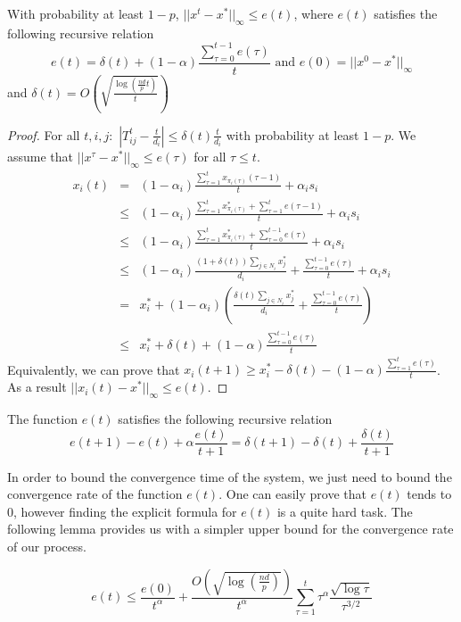 \begin{lemma}
With probability at least $1-p$, $||x^t - x^*||_{\infty} \leq e(t)$, where $e(t)$ satisfies the following recursive relation
$$e(t) = \delta(t) + (1-\alpha)\frac{\sum_{\tau=0}^{t-1}e(\tau)}{t} \text{ and } e(0)=||x^0 - x^*||_{\infty}$$
and $\delta(t)=O(\sqrt{\frac{\log(\frac{nd}{p}t)}{t}})$
\end{lemma}
\begin{proof}
For all $t,i,j:$ $|T_{ij}^t - \frac{t}{d_i}|\leq \delta(t)\frac{t}{d_i}$ with probability at least $1-p$. We assume that $||x^{\tau}-x^*||_{\infty} \leq e(\tau)$ for all $\tau \leq t$.
\begin{eqnarray*}
x_i(t) &=& (1-\alpha_i)\frac{\sum_{\tau=1}^{t}x_{\pi_i(\tau)}(\tau-1)}{t} + \alpha_i s_i\\
&\leq& (1-\alpha_i)\frac{\sum_{\tau=1}^{t}x^*_{\pi_i(\tau)} + \sum_{\tau=1}^{t} e(\tau-1)}{t} + \alpha_i s_i\\
&\leq& (1-\alpha_i)\frac{\sum_{\tau=1}^{t}x^*_{\pi_i(\tau)} + \sum_{\tau=0}^{t-1} e(\tau)}{t} + \alpha_i s_i\\
&\leq&  (1-\alpha_i)\frac{(1+\delta(t))\sum_{j \in N_i}x^*_{j}}{d_i} + \frac{\sum_{\tau=0}^{t-1} e(\tau)}{t} + \alpha_i s_i\\
&=& x_i^* + (1-\alpha_i)(\frac{\delta(t)\sum_{j \in N_i}x^*_{j}}{d_i} + \frac{\sum_{\tau=0}^{t-1} e(\tau)}{t})\\
&\leq& x_i^* + \delta(t) + (1-\alpha)\frac{\sum_{\tau=0}^{t-1} e(\tau)}{t}
\end{eqnarray*}
Equivalently, we can prove that $x_i(t+1) \geq x_i^* - \delta(t) - (1-\alpha)\frac{\sum_{\tau=1}^t e(\tau)}{t}$. As a result $||x_i(t)-x^*||_{\infty} \leq e(t)$.
\end{proof}

\begin{Col}
The function $e(t)$ satisfies the following recursive relation
$$e(t+1)-e(t) + \alpha \frac{e(t)}{t+1}=\delta(t+1)-\delta(t) + \frac{\delta(t)}{t+1}$$
\end{Col}
In order to bound the convergence time of the system, we just need to bound the convergence rate of the function $e(t)$. One can easily prove that $e(t)$ tends to $0$, however finding the explicit formula for $e(t)$ is a quite hard task. The following lemma provides us with a simpler upper bound for the convergence rate of our process.

\begin{lemma}
$$e(t) \leq \frac{e(0)}{t^\alpha} + \frac{O(\sqrt{\log(\frac{nd}{p})})}{t^\alpha}\sum_{\tau=1}^t\tau^\alpha\frac{\sqrt{\log \tau}}{\tau^{3/2}}$$
\end{lemma}

